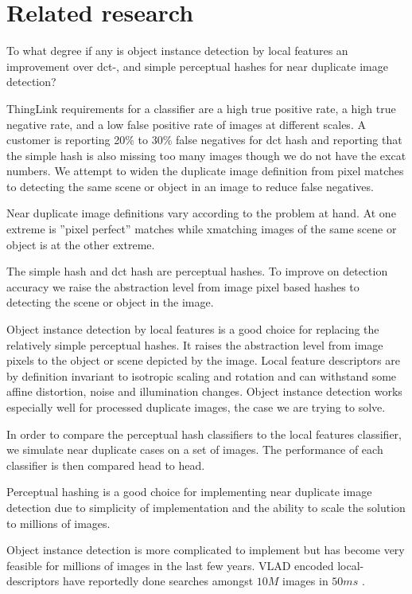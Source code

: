 \documentclass[english,12pt,a4paper,pdftex,elec,utf8]{aaltothesis}
\begin{document}
\clearpage

\section{Related research}
To what degree if any is object instance detection by local features an improvement over dct-, and simple perceptual hashes for near duplicate image detection?

ThingLink requirements for a classifier are a high true positive rate, a high true negative rate, and a low false positive rate of images at different scales. A customer is reporting 20\% to 30\% false negatives for dct hash and reporting that the simple hash is also missing too many images though we do not have the excat numbers. We attempt to widen the duplicate image definition from pixel matches to detecting the same scene or object in an image to reduce false negatives.

Near duplicate image definitions vary according to the problem at hand. At one extreme is ''pixel perfect'' matches while xmatching images of the same scene or object is at the other extreme.

The simple hash and dct hash are perceptual hashes. To improve on detection accuracy we raise the abstraction level from image pixel based hashes to detecting the scene or object in the image.

Object instance detection by local features is a good choice for replacing the relatively simple perceptual hashes. It raises the abstraction level from image pixels to the object or scene depicted by the image. Local feature descriptors are by definition invariant to isotropic scaling and rotation and can withstand some affine distortion, noise and illumination changes. Object instance detection works especially well for processed duplicate images, the case we are trying to solve.

In order to compare the perceptual hash classifiers to the local features classifier, we simulate near duplicate cases on a set of images. The performance of each classifier is then compared head to head.

Perceptual hashing is a good choice for implementing near duplicate image detection due to simplicity of implementation and the ability to scale the solution to millions of images.

Object instance detection is more complicated to implement but has become very feasible for millions of images in the last few years. VLAD encoded local-descriptors have reportedly done searches amongst $10M$ images in $50ms$ \cite{Jegou2010}.
\end{document}
